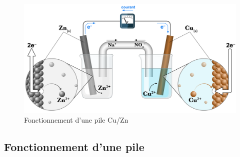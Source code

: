 \documentclass[
  11pt,
  a4paper,
  openany]{book}
\begin{document}
\begin{figure}

{\centering \includegraphics[width=0.9\linewidth]{images/pile-electrique} 

}

\caption{Fonctionnement d’une pile Cu/Zn}\label{fig:pile-electrique}
\end{figure}
\clearpage

\subsection{Fonctionnement d'une pile}\label{fonctionnement-dune-pile}
\end{document}
